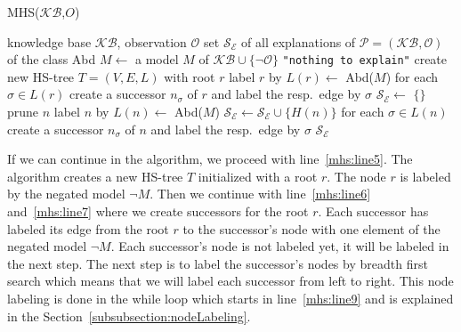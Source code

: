 \documentclass[12pt,a4paper]{article}
\begin{document}
\begin{algorithm}[H] 
	\footnotesize
	\caption{MHS($\mathcal{KB}$,$O$)}
	\label{alg:mhs}
	\begin{algorithmic}[1]
		\Require knowledge base $\mathcal{KB}$, observation $\mathcal{O}$
		\Ensure set $\mathcal{S}_{\mathcal{E}}$ of all explanations of $\mathcal{P}=(\mathcal{KB}, \mathcal{O})$ of the class Abd
		\State $M \gets$ a model $M$ of $\mathcal{KB} \cup \{\neg \mathcal{O}\}$ \label{mhs:line1}
		 \label{mhs:line2}
		\State \Return \texttt{"nothing to explain"} %
		\label{soal:nte}
		\EndIf %
		\State create new HS-tree $T=(V,E,L)$ with root $r$ \label{mhs:line5}
		\State label $r$ by $L(r) \gets$ Abd($M$) \label{mhs:line6}
		\State for each $\sigma\in L(r)$ create a successor $n_\sigma$ of $r$ \label{mhs:line7}
		and label the resp.\ edge by $\sigma$ %
		\State $\mathcal{S}_{\mathcal{E}} \gets$ $\{\}$ %
		  \label{mhs:line9}
		 \label{mhs:line10}
		\State prune $n$
		\State label $n$ by $L(n) \gets$  Abd($M$) 
		\Else %
		\State $\mathcal{S}_\mathcal{E} \gets \mathcal{S}_\mathcal{E} \cup \{H(n)\}$ \label{mhs:line15}
		\EndIf
		\State for each $\sigma\in L(n)$ create a successor $n_\sigma$ of $n$
		and label the resp.\ edge by $\sigma$ %
		\label{soal:modproc:e}
		\EndWhile
		\label{soal:loop:e}
		\label{soal:output}
		\State \Return $\mathcal{S}_\mathcal{E}$ \label{mhs:line19}
	\end{algorithmic}
\end{algorithm}

If we can continue in the algorithm, we proceed with line~\ref{mhs:line5}. The algorithm creates a new HS-tree $T$ initialized with a root $r$. The node $r$ is labeled by the negated model $\neg M$. Then we continue with line~\ref{mhs:line6} and~\ref{mhs:line7} where we create successors for the root $r$. Each successor has labeled its edge from the root $r$ to the successor's node with one element of the negated model $\neg M$. Each successor's node is not labeled yet, it will be labeled in the next step. The next step is to label the successor's nodes by breadth first search which means that we will label each successor from left to right. This node labeling is done in the while loop which starts in line~\ref{mhs:line9} and is explained in the Section~\ref{subsubsection:nodeLabeling}.
\end{document}
